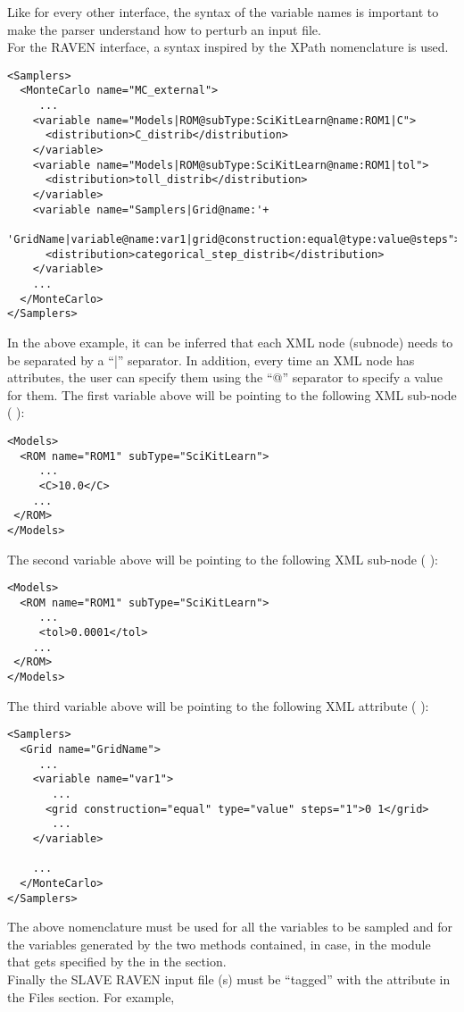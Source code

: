Like for every other interface,  the syntax of the variable names is important to make the parser understand how to perturb an input file.
\\ For the RAVEN interface, a syntax inspired by the XPath nomenclature is used.
\begin{lstlisting}[style=XML]
<Samplers>
  <MonteCarlo name="MC_external">
     ...
    <variable name="Models|ROM@subType:SciKitLearn@name:ROM1|C">
      <distribution>C_distrib</distribution>
    </variable>
    <variable name="Models|ROM@subType:SciKitLearn@name:ROM1|tol">
      <distribution>toll_distrib</distribution>
    </variable>
    <variable name="Samplers|Grid@name:'+
          'GridName|variable@name:var1|grid@construction:equal@type:value@steps">
      <distribution>categorical_step_distrib</distribution>
    </variable>
    ...
  </MonteCarlo>
</Samplers>
\end{lstlisting}
In the above example, it can be inferred that each XML node (subnode) needs to be separated by a ``|'' separator. In addition,
every time an XML node has attributes, the user can specify them using the ``@'' separator to specify a value for them.
The first variable above will be pointing to the following XML sub-node ( ):
\begin{lstlisting}[style=XML]
<Models>
  <ROM name="ROM1" subType="SciKitLearn">
     ...
     <C>10.0</C>
    ...
 </ROM>
</Models>
\end{lstlisting}
The second variable above will be pointing to the following XML sub-node ( ):
\begin{lstlisting}[style=XML]
<Models>
  <ROM name="ROM1" subType="SciKitLearn">
     ...
     <tol>0.0001</tol>
    ...
 </ROM>
</Models>
\end{lstlisting}
The third variable above will be pointing to the following XML attribute ( ):
\begin{lstlisting}[style=XML]
<Samplers>
  <Grid name="GridName">
     ...
    <variable name="var1">
       ...
      <grid construction="equal" type="value" steps="1">0 1</grid>
       ...
    </variable>

    ...
  </MonteCarlo>
</Samplers>
\end{lstlisting}

The above nomenclature must be used for all the variables to be sampled and for the variables generated by the two methods contained, in case, in
the module that gets specified by the  in the  section.
\\ Finally the SLAVE RAVEN input file (s) must be ``tagged'' with the attribute   in the Files section. For example,

